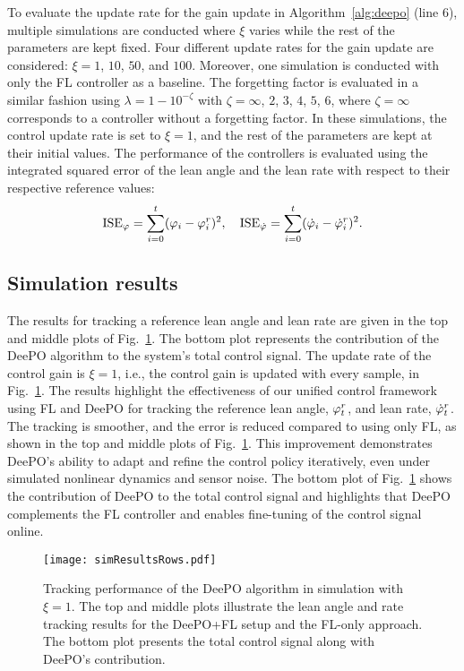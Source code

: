 To evaluate the update rate for the gain update in Algorithm~\ref{alg:deepo} (line 6), multiple simulations are conducted where $\xi$ varies while the rest of the parameters are kept fixed. Four different update rates for the gain update are considered: $\xi=1$, $10$, $50$, and $100$. Moreover, one simulation is conducted with only the FL controller as a baseline. The forgetting factor is evaluated in a similar fashion using $\lambda = 1-10^{-\zeta}$ with $\zeta=\infty$, $2$, $3$, $4$, $5$, $6$, where $\zeta=\infty$ corresponds to a controller without a forgetting factor. In these simulations, the control update rate is set to $\xi=1$, and the rest of the parameters are kept at their initial values. The performance of the controllers is evaluated using the integrated squared error of the lean angle and the lean rate with respect to their respective reference values: 
\begin{equation}
    \text{ISE}_\varphi = \sum_{i=0}^t (\varphi_{i}-\varphi_{i}^{r})^2,\quad \text{ISE}_{\dot{\varphi}} = \sum_{i=0}^t (\dot{\varphi}_{i}-\dot{\varphi}_{i}^{r})^2.
\end{equation}

\subsection{Simulation results}
The results for tracking a reference lean angle and lean rate are given in the top and middle plots of Fig.~\ref{fig:simResults}. The bottom plot represents the contribution of the DeePO algorithm to the system's total control signal. The update rate of the control gain is $\xi=1$, i.e., the control gain is updated with every sample, in Fig.~\ref{fig:simResults}. The results highlight the effectiveness of our unified control framework using FL and DeePO for tracking the reference lean angle, $\varphi_{t}^{r}$, and lean rate, $\dot{\varphi}_{t}^{r}$. The tracking is smoother, and the error is reduced compared to using only FL, as shown in the top and middle plots of Fig.~\ref{fig:simResults}. This improvement demonstrates DeePO's ability to adapt and refine the control policy iteratively, even under simulated nonlinear dynamics and sensor noise. The bottom plot of Fig.~\ref{fig:simResults} shows the contribution of DeePO to the total control signal and highlights that DeePO complements the FL controller and enables fine-tuning of the control signal online.

\begin{figure}[t]
    \centering
    \texttt{[image: simResultsRows.pdf]}
    \caption{Tracking performance of the DeePO algorithm in simulation with $\xi = 1$. The top and middle plots illustrate the lean angle and rate tracking results for the DeePO+FL setup and the FL-only approach. The bottom plot presents the total control signal along with DeePO’s contribution.}
    \label{fig:simResults}
\end{figure}

